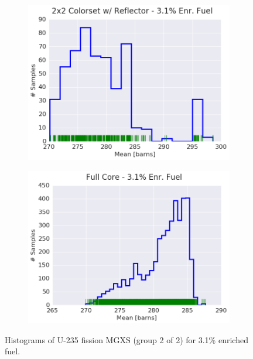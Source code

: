 \begin{figure}[h!]
\begin{subfigure}{0.5\textwidth}
  \includegraphics[width=\linewidth]{figures/patterns/reflector/hist-kde-rug/31-enr-fiss-2}  \caption{}
  \label{fig:chap9-hist-reflector-3.1-fiss}
\end{subfigure}%
\begin{subfigure}{0.5\textwidth}
  \centering
  \includegraphics[width=\linewidth]{figures/patterns/full-core/hist-kde-rug/31-enr-fiss-2} \caption{}
  \label{fig:chap9-hist-full-core-3.1-fiss}
\end{subfigure}
\caption[Histogram of U-235 fission MGXS 3.1\% enriched fuel]{Histograms of U-235 fission \ac{MGXS} (group 2 of 2) for 3.1\% enriched fuel.}
\label{fig:chap9-hist-3.1-fiss}
\end{figure}

